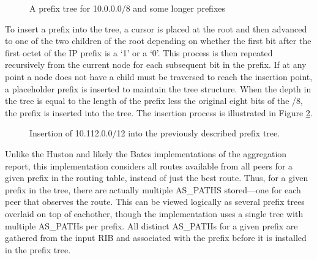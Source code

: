 \begin{figure}
    \caption{A prefix tree for 10.0.0.0/8 and some longer prefixes}
    \label{fig:ex_prefix_tree}
\end{figure}

To insert a prefix into the tree, a cursor is placed at the root and then advanced to one of the two children of the root depending on whether the first bit after the first octet of the IP prefix is a `1' or a `0'. This process is then repeated recursively from the current node for each subsequent bit in the prefix. If at any point a node does not have a child must be traversed to reach the insertion point, a placeholder prefix is inserted to maintain the tree structure. When the depth in the tree is equal to the length of the prefix less the original eight bits of the /8, the prefix is inserted into the tree. The insertion process is illustrated in Figure \ref{fig:ex_prefix_tree_insert}.

\begin{figure}
    \caption{Insertion of 10.112.0.0/12 into the previously described prefix tree.}
    \label{fig:ex_prefix_tree_insert}
\end{figure}

Unlike the Huston and likely the Bates implementations of the aggregation report, this implementation considers all routes available from all peers for a given prefix in the routing table, instead of just the best route. Thus, for a given prefix in the tree, there are actually multiple AS\_PATHS stored---one for each peer that observes the route. This can be viewed logically as several prefix trees overlaid on top of eachother, though the implementation uses a single tree with multiple AS\_PATHs per prefix. All distinct AS\_PATHs for a given prefix are gathered from the input RIB and associated with the prefix before it is installed in the prefix tree.

